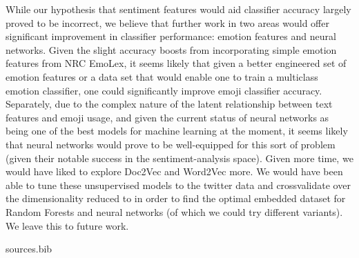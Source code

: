 \documentclass[11pt]{article}
\begin{document}
While our hypothesis that sentiment features would aid classifier accuracy largely proved to be incorrect, we believe that further work in two areas would offer significant improvement in classifier performance: emotion features and neural networks. Given the slight accuracy boosts from incorporating simple emotion features from NRC EmoLex, it seems likely that given a better engineered set of emotion features or a data set that would enable one to train a multiclass emotion classifier, one could significantly improve emoji classifier accuracy. Separately, due to the complex nature of the latent relationship between text features and emoji usage, and given the current status of neural networks as being one of the best models for machine learning at the moment, it seems likely that neural networks would prove to be well-equipped for this sort of problem (given their notable success in the sentiment-analysis space). Given more time, we would have liked to explore Doc2Vec and Word2Vec more. We would have been able to tune these unsupervised models to the twitter data and crossvalidate over the dimensionality reduced to in order to find the optimal embedded dataset for Random Forests and neural networks (of which we could try different variants). We leave this to future work.

 {sources.bib} 

\end{document}
